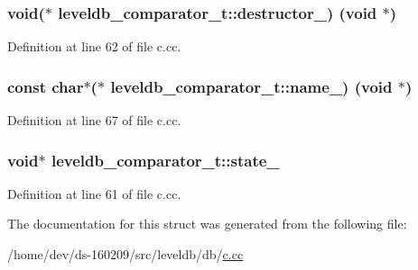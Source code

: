 \subsubsection[{destructor\+\_\+}]{\setlength{\rightskip}{0pt plus 5cm}void($\ast$ leveldb\+\_\+comparator\+\_\+t\+::destructor\+\_\+) (void $\ast$)}\label{structleveldb__comparator__t_a757b51457e991ab2219fd5931426bb29}


Definition at line 62 of file c.\+cc.

\hypertarget{structleveldb__comparator__t_a0ed64d60a3e077ed065d745fb6bdee15}{}
\subsubsection[{name\+\_\+}]{\setlength{\rightskip}{0pt plus 5cm}const char$\ast$($\ast$ leveldb\+\_\+comparator\+\_\+t\+::name\+\_\+) (void $\ast$)}\label{structleveldb__comparator__t_a0ed64d60a3e077ed065d745fb6bdee15}


Definition at line 67 of file c.\+cc.

\hypertarget{structleveldb__comparator__t_a720da927befa8098f21437c663d0b0e2}{}
\subsubsection[{state\+\_\+}]{\setlength{\rightskip}{0pt plus 5cm}void$\ast$ leveldb\+\_\+comparator\+\_\+t\+::state\+\_\+}\label{structleveldb__comparator__t_a720da927befa8098f21437c663d0b0e2}


Definition at line 61 of file c.\+cc.



The documentation for this struct was generated from the following file\+:\begin{DoxyCompactItemize}
\item 
/home/dev/ds-\/160209/src/leveldb/db/\hyperlink{c_8cc}{c.\+cc}\end{DoxyCompactItemize}
